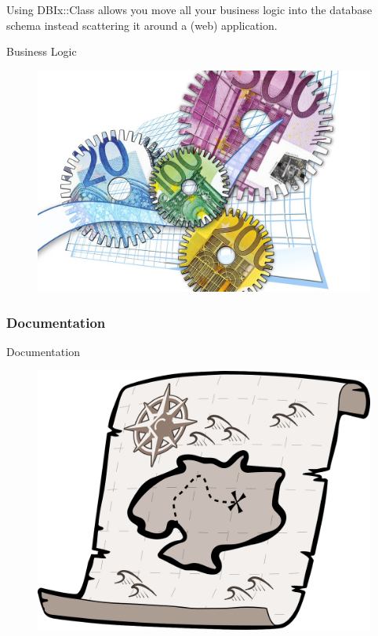 Using DBIx::Class allows you move all your business logic
into the database schema instead scattering it around a (web)
application.

\begin{frame}{Business Logic}
\begin{figure}[!ht]
\centering
\includegraphics[width=0.75\linewidth]{img/business-logic.jpg}
\end{figure}
\end{frame}

\subsubsection{Documentation}

\begin{frame}{Documentation}
\begin{figure}[!ht]
\centering
\includegraphics[width=0.6\linewidth]{img/documentation.png}
\end{figure}
\end{frame}

